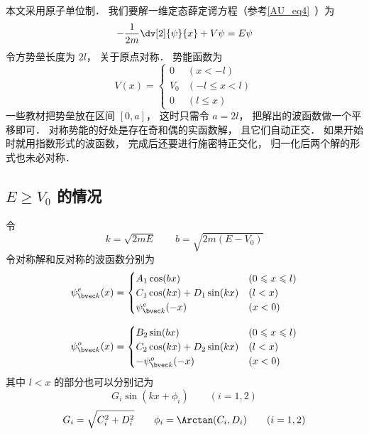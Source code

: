
\begin{issues}
\issueDraft
\end{issues}



本文采用原子单位制． 我们要解一维定态薛定谔方程（参考\autoref{AU_eq4}~）为
\begin{equation}
-\frac{1}{2m} \dv[2]{\psi}{x} + V\psi= E \psi
\end{equation}
令方势垒长度为 $2l$， 关于原点对称． 势能函数为
\begin{equation}
V(x) =
\begin{cases}
0 & (x < -l)\\
V_0 & (-l \leqslant x < l)\\
0 & (l \leqslant x)
\end{cases}
\end{equation}
一些教材把势垒放在区间 $[0, a]$， 这时只需令 $a = 2l$， 把解出的波函数做一个平移即可． 对称势能的好处是存在奇和偶的实函数解， 且它们自动正交． 如果开始时就用指数形式的波函数， 完成后还要进行施密特正交化， 归一化后两个解的形式也未必对称．

\subsection{$E \ge V_0$ 的情况}
令
\begin{equation}
k = \sqrt{2mE}
\qquad
b = \sqrt{2m(E-V_0)}
\end{equation}
令对称解和反对称的波函数分别为
\begin{equation}
\psi_{\bvec k}^e(x) =
\begin{cases}
A_1 \cos(bx) & (0 \leqslant x \leqslant l)\\
C_1 \cos(kx) + D_1 \sin(kx) & (l < x)\\
\psi_{\bvec k}^e(-x) & (x < 0)
\end{cases}
\end{equation}

\begin{equation}
\psi_{\bvec k}^o(x) =
\begin{cases}
B_2 \sin(bx) & (0 \leqslant x \leqslant l)\\
C_2 \cos(kx) + D_2 \sin(kx) & (l < x)\\
-\psi_{\bvec k}^o(-x) & (x < 0)
\end{cases}
\end{equation}
其中 $l < x$ 的部分也可以分别记为
\begin{equation}
G_i \sin(kx + \phi_i) \qquad (i = 1,2)
\end{equation}
\begin{equation}
G_i = \sqrt{C_i^2 + D_i^2}
\qquad
\phi_i = \Arctan(C_i, D_i)
\qquad
(i = 1,2)
\end{equation}


